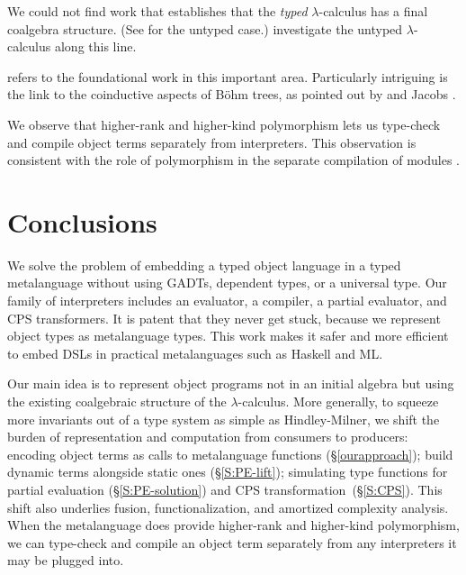We could not find work that establishes that
the \emph{typed} $\lambda$-calculus has a final coalgebra structure.
\ifshort
(See  for the untyped case.)
\else
{}
investigate the untyped $\lambda$-calculus
along this line.  
\begin{comment}
In particular, they use
contexts with a hole \citep[p.\,13]{honsell99coinductive} to define
\emph{observational equivalence}
(see our~\S\ref{selfinterp}).
\end{comment}
 refers to the
foundational work in this important area.  
Particularly intriguing is the link to the
coinductive aspects of B\"{o}hm trees, as pointed out by
\citet{berarducci-models} and Jacobs \citeyearpar[Example 4.3.4]{jacobs-coalgebra}.
\fi

We observe that
higher-rank and higher-kind
polymorphism lets us type-check and compile object terms separately from
interpreters.  This \ifshort\else observation \fi is consistent with the role of
polymorphism in the separate compilation of modules
\citep{shao-typed}.

\section{Conclusions}\label{conclusion}

We solve the problem of embedding a typed object language in a typed
metalanguage without using GADTs, dependent types, or a universal type.
Our family of interpreters includes an evaluator, a compiler, a partial
evaluator, and CPS transformers.  It is patent that they never get stuck,
because we represent object types as metalanguage types.  This work
makes it safer and more efficient to embed DSLs
in practical metalanguages such as Haskell and ML\@.

Our main idea is to represent object programs not in an initial algebra
but using the existing coalgebraic structure of the $\lambda$-calculus.
More generally, to squeeze more invariants out of a type system as
simple as Hindley-Milner, we shift the burden of representation and
computation from consumers to producers: encoding object terms as calls
to metalanguage functions (\S\ref{ourapproach}); build dynamic terms
alongside static ones (\S\ref{S:PE-lift}); simulating type functions for
partial evaluation (\S\ref{S:PE-solution}) and CPS
transformation\ifshort\else~(\S\ref{S:CPS})\fi.
This shift also underlies fusion,
functionalization, and amortized complexity analysis.
\ifshort\else
When the metalanguage does provide higher-rank and higher-kind
polymorphism, we can type-check and compile an object term separately
from any interpreters it may be plugged into.
\fi
